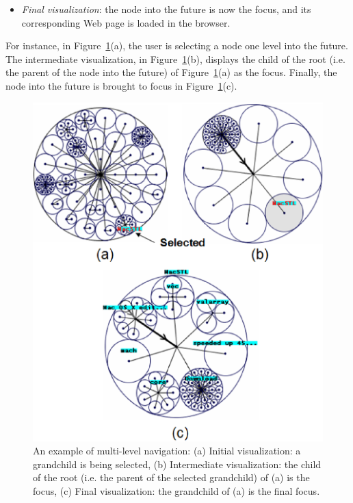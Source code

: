 \documentclass[]{article}
\begin{document}
{\begin{itemize}
\item {\em Final visualization}: the node into the future is now the focus, and its corresponding Web page is loaded in the browser.

\end{itemize}

For instance, in Figure~\ref{fig_multi-level}(a), the user is selecting a node one level into the future.
The intermediate visualization, in Figure~\ref{fig_multi-level}(b), displays the child of the root (i.e. the parent of the node into the future) of Figure~\ref{fig_multi-level}(a) as the focus.
Finally, the node into the future is brought to focus in Figure~\ref{fig_multi-level}(c).


\begin{figure}[tb]
\centering
\includegraphics[width=5.0in]{images/select_2levelsBETTER}
\caption{An example of multi-level navigation: (a) Initial visualization: a grandchild is being selected, (b) Intermediate visualization: the child of the root (i.e. the parent of the selected grandchild) of (a) is the focus, 
(c) Final visualization: the grandchild of (a) is the final focus.}
\label{fig_multi-level}
\end{figure}

}
\end{document}
